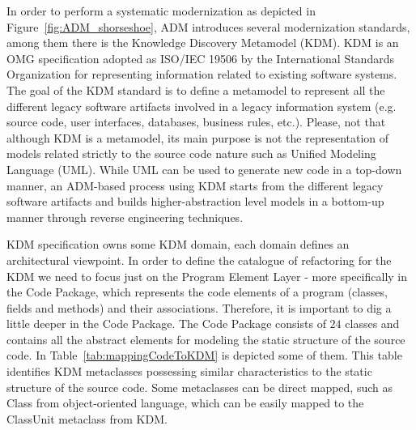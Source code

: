In order to perform a systematic modernization as depicted in Figure~\ref{fig:ADM_shorseshoe}, ADM introduces several modernization standards, among them there is the Knowledge Discovery Metamodel (KDM).
KDM is an OMG specification adopted as ISO/IEC 19506 by the International Standards Organization for representing information related to existing software systems. 
The goal of the KDM standard is to define a metamodel to represent all the different legacy software artifacts involved in a legacy information system (e.g. source code, user interfaces, databases, business rules, etc.). %
Please, not that although KDM is a metamodel, its main purpose is not the representation of models related strictly to the source code nature such as Unified Modeling Language (UML). While UML can be used to generate new code in a top-down manner, an ADM-based process using KDM starts from the different legacy software artifacts and builds higher-abstraction level models in a bottom-up manner through reverse engineering techniques. %

KDM specification owns some KDM domain, each domain defines an architectural viewpoint. In order to define the catalogue of refactoring for the KDM we need to focus just on the Program Element Layer - more specifically  in the Code Package, which represents the code elements of a program (classes, fields and methods) and their associations. %
Therefore, it is important to dig a little deeper in the Code Package.
%
%
The Code Package consists of $24$ classes and contains all the abstract elements for modeling the static structure of the source code. In Table~\ref{tab:mappingCodeToKDM} is depicted some of them. This table identifies KDM metaclasses possessing similar characteristics to the static structure of the source code. Some metaclasses can be direct mapped, such as Class from object-oriented language, which can be easily mapped to the ClassUnit metaclass from KDM.



